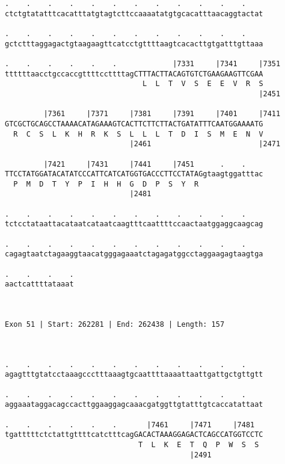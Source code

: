 \documentclass{article}
\begin{document}
\begin{Verbatim}
.    .    .    .    .    .    .    .    .    .    .    .    
ctctgtatatttcacatttatgtagtcttccaaaatatgtgcacatttaacaggtactat
                                                            
.    .    .    .    .    .    .    .    .    .    .    .    
gctctttaggagactgtaagaagttcatcctgttttaagtcacacttgtgatttgttaaa
                                                            
.    .    .    .    .    .             |7331     |7341     |7351
ttttttaacctgccaccgttttccttttagCTTTACTTACAGTGTCTGAAGAAGTTCGAA
                                L  L  T  V  S  E  E  V  R  S
                                                           |2451
  
         |7361     |7371     |7381     |7391     |7401     |7411
GTCGCTGCAGCCTAAAACATAGAAAGTCACTTCTTCTTACTGATATTTCAATGGAAAATG
  R  C  S  L  K  H  R  K  S  L  L  L  T  D  I  S  M  E  N  V
                             |2461                         |2471
  
         |7421     |7431     |7441     |7451      .    .    
TTCCTATGGATACATATCCCATTCATCATGGTGACCCTTCCTATAGgtaagtggatttac
  P  M  D  T  Y  P  I  H  H  G  D  P  S  Y  R               
                             |2481                          
  
.    .    .    .    .    .    .    .    .    .    .    .    
tctcctataattacataatcataatcaagtttcaattttccaactaatggaggcaagcag
                                                            
.    .    .    .    .    .    .    .    .    .    .    .    
cagagtaatctagaaggtaacatgggagaaatctagagatggcctaggaagagtaagtga
                                                            
.    .    .    .
aactcattttataaat
                
                
 
Exon 51 | Start: 262281 | End: 262438 | Length: 157



.    .    .    .    .    .    .    .    .    .    .    .    
agagtttgtatcctaaagccctttaaagtgcaattttaaaattaattgattgctgttgtt
                                                            
.    .    .    .    .    .    .    .    .    .    .    .    
aggaaataggacagccacttggaaggagcaaacgatggttgtatttgtcaccatattaat
                                                            
.    .    .    .    .    .       |7461     |7471     |7481  
tgatttttctctattgttttcatctttcagGACACTAAAGGAGACTCAGCCATGGTCCTC
                               T  L  K  E  T  Q  P  W  S  S 
                                           |2491            
  

\end{Verbatim}
\end{document}
